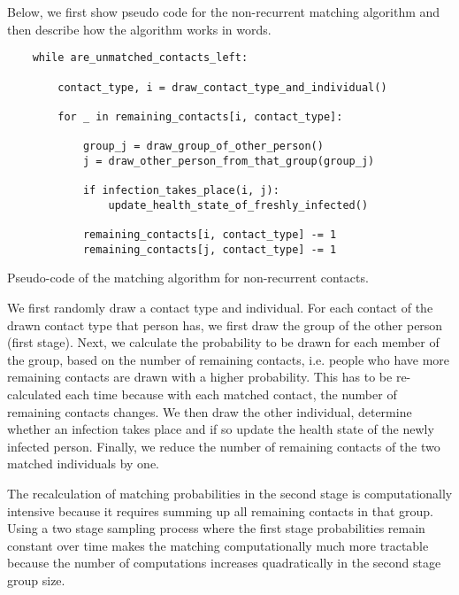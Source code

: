 Below, we first show pseudo code for the non-recurrent matching algorithm and then
describe how the algorithm works in words.

\begin{listing}

    \label{code:matching}
    \begin{verbatim}
    while are_unmatched_contacts_left:

        contact_type, i = draw_contact_type_and_individual()

        for _ in remaining_contacts[i, contact_type]:

            group_j = draw_group_of_other_person()
            j = draw_other_person_from_that_group(group_j)

            if infection_takes_place(i, j):
                update_health_state_of_freshly_infected()

            remaining_contacts[i, contact_type] -= 1
            remaining_contacts[j, contact_type] -= 1
    \end{verbatim}
    \caption{Pseudo-code of the matching algorithm for non-recurrent contacts.}
\end{listing}

We first randomly draw a contact type and individual. For each contact of the drawn
contact type that person has, we first draw the group of the other person (first stage).
Next, we calculate the probability to be drawn for each member of the group, based on
the number of remaining contacts, i.e. people who have more remaining contacts are drawn
with a higher probability. This has to be re-calculated each time because with each
matched contact, the number of remaining contacts changes. We then draw the other
individual, determine whether an infection takes place and if so update the health state
of the newly infected person. Finally, we reduce the number of remaining contacts of the
two matched individuals by one.

The recalculation of matching probabilities in the second stage is computationally
intensive because it requires summing up all remaining contacts in that group. Using a
two stage sampling process where the first stage probabilities remain constant over time
makes the matching computationally much more tractable because the number of
computations increases quadratically in the second stage group size.
